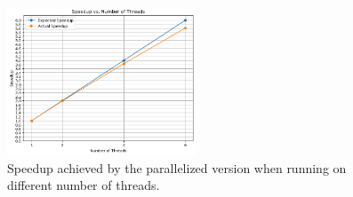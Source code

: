 \documentclass{article}
\begin{document}
\begin{figure}[htbp]
    \centering
    \includegraphics[width=0.5\textwidth]{img/speedup-threads.png}
    \caption{Speedup achieved by the parallelized version when running on different number of threads.}
    \label{fig:name}
\end{figure}

\newpage



% 

\end{document}
